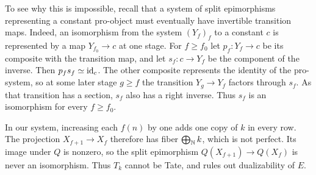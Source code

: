 \begin{example}[Efimov]
		To see why this is impossible, recall that a system of split epimorphisms representing a constant pro-object must eventually have invertible transition maps. Indeed, an isomorphism from the system $(Y_f)_f$ to a constant $c$ is represented by a map $Y_{f_0}\to c$ at one stage. For $f\geq f_0$ let $p_f\colon Y_f\to c$ be its composite with the transition map, and let $s_f\colon c\to Y_f$ be the component of the inverse. Then $p_fs_f\simeq\operatorname{id}_c$. The other composite represents the identity of the pro-system, so at some later stage $g\geq f$ the transition $Y_g\to Y_f$ factors through $s_f$. As that transition has a section, $s_f$ also has a right inverse. Thus $s_f$ is an isomorphism for every $f\geq f_0$.

		In our system, increasing each $f(n)$ by one adds one copy of $k$ in every row. The projection $X_{f+1}\to X_f$ therefore has fiber $\bigoplus_{\operatorname{\mathbb N}}k$, which is not perfect. Its image under $Q$ is nonzero, so the split epimorphism $Q(X_{f+1})\to Q(X_f)$ is never an isomorphism. Thus $T_k$ cannot be Tate, and  rules out dualizability of $E$.
	\end{example}

